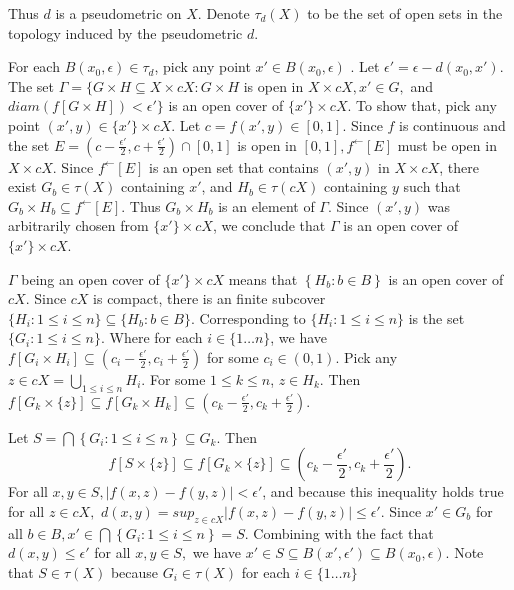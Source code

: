 \documentclass{amsart}
\begin{document}
Thus $d$ is a pseudometric on $X$. Denote $\tau_d(X)$ to be the set of open sets in the topology induced by the pseudometric $d$. 

\vskip 10pt

For each $B(x_0, \epsilon) \in \tau_d$, pick any point $x' \in B(x_0, \epsilon)$ . Let $\epsilon' = \epsilon - d(x_0,x').$ 
The set $\Gamma=\{ G \times H \subseteq X \times cX : G \times H$ is open in $X \times cX, x'\in G,$ and $diam\left(f\left[G\times H\right]\right)<\epsilon' \}$ is an open cover of $\{x'\} \times cX$. To show that, pick any point $(x',y)\in \{x'\} \times cX$. Let $c=f(x',y)\in [0,1].$ Since $f$ is continuous and the set $E=(c-\frac{\epsilon'}{2}, c+\frac{\epsilon'}{2}) \cap [0,1]$ is open in $[0,1], f^\leftarrow[E]$ must be open in $X\times cX$. Since $f^{\leftarrow}[E]$ is an open set that contains $(x',y)$ in $X\times cX$, there exist $G_b \in \tau(X)$ containing $x'$, and $H_b \in \tau(cX)$ containing $y$ such that $G_b\times H_b\subseteq f^\leftarrow[E]$. Thus $G_b\times H_b$ is an element of $\Gamma$. Since $(x',y)$ was arbitrarily chosen from $\{x'\}\times cX$, we conclude that $\Gamma$ is an open cover of $\{x'\}\times cX$.

\vskip 10pt

$\Gamma$ being an open cover of $\{x'\}\times cX$ means that $\left\{ H_b : b \in B \right\}$ is an open cover of $cX$. Since $cX$ is compact, there is an finite subcover $\{ H_i: 1\leq i \leq n\} \subseteq \{H_b : b \in B\}.$ Corresponding to $\{ H_i: 1\leq i \leq n\}$ is the set $\{ G_i: 1\leq i \leq n\}$. Where for each $i \in \{1\dots n\}$, we have $f[G_i \times H_i] \subseteq (c_i-\frac{\epsilon'}{2}, c_i+\frac{\epsilon'}{2})$ for some $c_i \in (0,1).$ Pick any $z \in cX=\bigcup_{1\leq i \leq n} H_i.$ For some $1 \leq k \leq n$, $z \in H_k$. Then $f[G_k\times \{z\}] \subseteq f[G_k\times H_k]\subseteq (c_k-\frac{\epsilon'}{2}, c_k+\frac{\epsilon'}{2}).$ 

\vskip 10pt

Let $S=\bigcap\left\{G_i:1\leq i \leq n\right\}  \subseteq G_k.$ Then 
$$f[S\times \{z\}]\subseteq f[G_k \times \{z\}] \subseteq (c_k-\frac{\epsilon'}{2}, c_k+\frac{\epsilon'}{2}).$$ 
For all $x,y \in S, |f(x,z)-f(y,z)|<\epsilon'$, and because this inequality holds true for all $z \in cX,$ $d(x,y)=\displaystyle{sup_{z\in cX}} |f(x,z)-f(y,z)|\leq \epsilon'.$ Since $x' \in G_b$ for all $b\in B, x' \in \bigcap \left\{G_i: 1\leq i \leq n\right\} = S.$ Combining with the fact that $d(x,y)\leq \epsilon'$ for all $x,y \in S,$ we have $x' \in S \subseteq B(x',\epsilon') \subseteq B(x_0, \epsilon).$ Note that $S\in \tau(X)$ because $G_i\in \tau(X)$ for each $i\in \{1\dots n\}$
\end{document}
